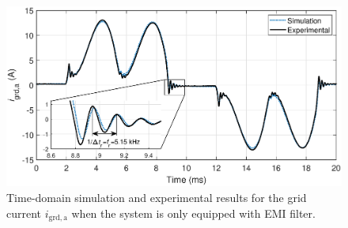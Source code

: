 \documentclass[journal,a4paper,10pt,twoside]{IEEEtran} %
\begin{document}
	\begin{figure}
	    \begin{center}
	                \includegraphics[clip, trim=1.25cm 6.5cm 1.25cm 7cm, width=1\linewidth]{FIGS/FIG_12.eps}
	    \end{center}
	    \vspace{-3mm}
	    \caption{Time-domain simulation and experimental results for the grid current $i_{\mathrm{grd,a}}$ when the system is only equipped with EMI filter.}
	    \label{FIG11}
	\end{figure}
	
\end{document}
